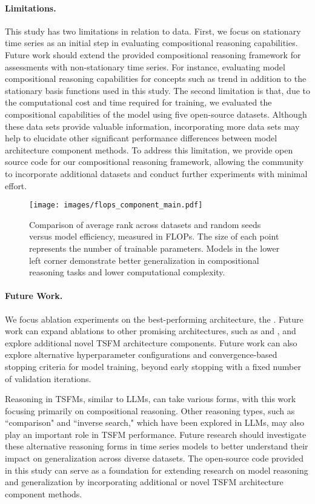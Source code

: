 \paragraph{Limitations.}\label{apd:limitations}
This study has two limitations in relation to data. First, we focus on stationary time series as an initial step in evaluating compositional reasoning capabilities. Future work should extend the provided compositional reasoning framework for assessments with non-stationary time series. For instance, evaluating model compositional reasoning capabilities for concepts such as trend in addition to the stationary basis functions used in this study. The second limitation is that, due to the computational cost and time required for training, we evaluated the compositional capabilities of the model using five open-source datasets. Although these data sets provide valuable information, incorporating more data sets may help to elucidate other significant performance differences between model architecture component methods. To address this limitation, we provide open source code for our compositional reasoning framework, allowing the community to incorporate additional datasets and conduct further experiments with minimal effort. 


\begin{figure}[t!]
    \centering
    \texttt{[image: images/flops\_component\_main.pdf]}
    \caption{Comparison of average rank across datasets and random seeds versus model efficiency, measured in FLOPs. The size of each point represents the number of trainable parameters. Models in the lower left corner demonstrate better generalization in compositional reasoning tasks and lower computational complexity.}
    \label{fig:flops_model_comparison}
\end{figure}


\paragraph{Future Work.} We focus ablation experiments on the best-performing architecture, the \Tfive. Future work can expand ablations to other promising architectures, such as \NBEATS and \NHITS, and explore additional novel TSFM architecture components. Future work can also explore alternative hyperparameter configurations and convergence-based stopping criteria for model training, beyond early stopping with a fixed number of validation iterations. 

Reasoning in TSFMs, similar to LLMs, can take various forms, with this work focusing primarily on compositional reasoning. Other reasoning types, such as ``comparison" and ``inverse search," which have been explored in LLMs, may also play an important role in TSFM performance. Future research should investigate these alternative reasoning forms in time series models to better understand their impact on generalization across diverse datasets. The open-source code provided in this study can serve as a foundation for extending research on model reasoning and generalization by incorporating additional or novel TSFM architecture component methods.
